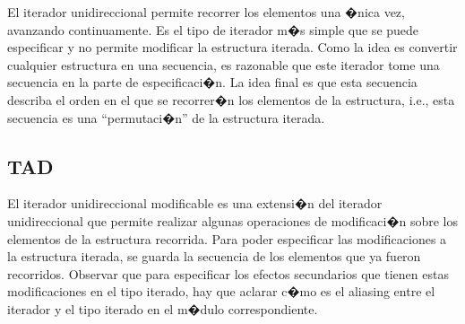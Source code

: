 \documentclass[a4paper,10pt]{article}
\begin{document}
El iterador unidireccional permite recorrer los elementos una �nica vez, avanzando continuamente.  Es el tipo de iterador m�s simple que se puede especificar y no permite modificar la estructura iterada.  Como la idea es convertir cualquier estructura en una secuencia, es razonable que este iterador tome una secuencia en la parte de especificaci�n.  La idea final es que esta secuencia describa el orden en el que se recorrer�n los elementos de la estructura, i.e., esta secuencia es una ``permutaci�n'' de la estructura iterada.

\begin{tad}{}




  \tadObservadores

  \tadGeneradores

  \tadOtrasOperaciones


  \tadAxiomas
\end{tad}

\subsection{TAD }

El iterador unidireccional modificable es una extensi�n del iterador unidireccional que permite realizar algunas operaciones de modificaci�n sobre los elementos de la estructura recorrida.  Para poder especificar las modificaciones a la estructura iterada, se guarda la secuencia de los elementos que ya fueron recorridos.  Observar que para especificar los efectos secundarios que tienen estas modificaciones en el tipo iterado, hay que aclarar c�mo es el aliasing entre el iterador y el tipo iterado en el m�dulo correspondiente.
\end{document}

